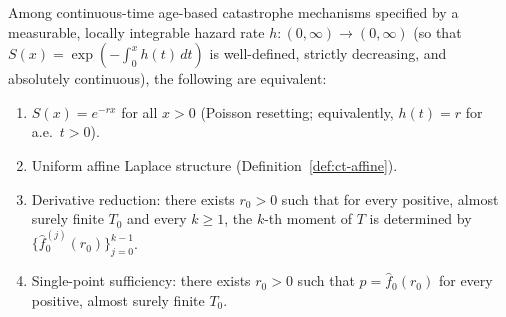 \documentclass[10pt,a4paper]{amsart}
\begin{document}
\begin{theorem}\label{thm:ct-char}
Among continuous-time age-based catastrophe mechanisms specified by a measurable, locally integrable hazard rate $h: (0,\infty) \to (0,\infty)$ (so that $S(x) = \exp(-\int_0^x h(t)\,dt)$ is well-defined, strictly decreasing, and absolutely continuous), the following are equivalent:
\begin{enumerate}[\rm (a)]
  \item $S(x) = e^{-rx}$ for all $x > 0$ (Poisson resetting; equivalently,
  $h(t) = r$ for a.e.\ $t > 0$).
  \item Uniform affine Laplace structure (Definition~\ref{def:ct-affine}).
  \item Derivative reduction: there exists $r_0 > 0$ such that for every
  positive, almost surely finite $T_0$ and every $k \ge 1$, the $k$-th
  moment of $T$ is determined by
  $\{\hat f_0^{(j)}(r_0)\}_{j=0}^{k-1}$.
  \item Single-point sufficiency: there exists $r_0 > 0$ such that
  $p = \hat f_0(r_0)$ for every positive, almost surely finite $T_0$.
\end{enumerate}
\end{theorem}
\end{document}
